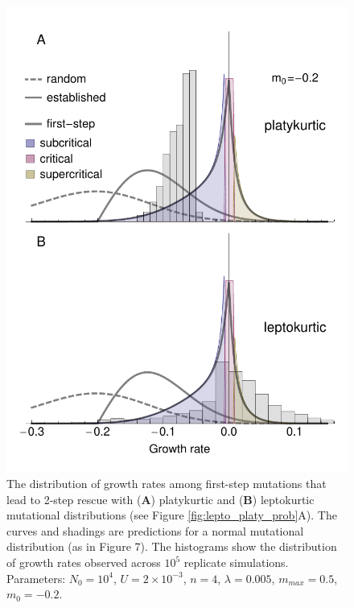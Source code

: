 \documentclass[9pt,twocolumn,twoside]{../main/gsajnl}
\begin{document}
\begin{figure}[htbp]
\centering
\includegraphics[width=\linewidth]{FigureS5.pdf}
\caption{
The distribution of growth rates among first-step mutations that lead to 2-step rescue with (\textbf{A}) platykurtic and (\textbf{B}) leptokurtic mutational distributions (see Figure \ref{fig:lepto_platy_prob}A).
The curves and shadings are predictions for a normal mutational distribution (as in Figure 7).
The histograms show the distribution of growth rates observed across $10^5$ replicate simulations.
Parameters: $N_0=10^4$, $U=2\times 10^{-3}$, $n=4$, $\lambda=0.005$, $m_{max}=0.5$, $m_0=-0.2$.
}%
\label{fig:lepto_platy_dfe_int}
\end{figure}
\end{document}
